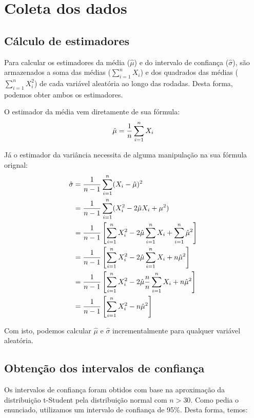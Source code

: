 \documentclass[a4paper,10pt]{article}
\begin{document}
\section{Coleta dos dados}\label{ColetaDosDados}

\subsection{Cálculo de estimadores}

Para calcular os estimadores da média ($\hat{\mu}$) e do intervalo de confiança ($\hat{\sigma}$), são armazenados a soma das médias ($\sum_{i = 1}^n X_i$) e dos quadrados das médias ($\sum_{i = 1}^n X_ i^2$) de cada variável aleatória ao longo das rodadas. Desta forma, podemos obter ambos os estimadores.

O estimador da média vem diretamente de sua fórmula:
\begin{equation}\label{estimadorMedia}
	\hat{\mu} = {{1} \over {n}} \sum_{i = 1}^n X_i
\end{equation}

Já o estimador da variância necessita de alguma manipulação na sua fórmula orignal:
\begin{align}
	\hat{\sigma} &= {{1} \over {n - 1}} \sum_{i = 1}^n (X_i - \hat{\mu})^2 \\
	&= {{1} \over {n - 1}} \sum_{i = 1}^n (X_i^2 - 2 \hat{\mu} X_i + \mu^2) \\
	&= {{1} \over {n - 1}} \left[ \sum_{i = 1}^n X_i^2 - 2 \hat{\mu} \sum_{i = 1}^n X_i + \sum_{i = 1}^n \hat{\mu}^2 \right] \\
	&= {{1} \over {n - 1}} \left[ \sum_{i = 1}^n X_i^2 - 2 \hat{\mu} \sum_{i = 1}^n X_i + n \hat{\mu}^2 \right] \\
	&= {{1} \over {n - 1}} \left[ \sum_{i = 1}^n X_i^2 - 2 \hat{\mu} {{n}\over{n}} \sum_{i = 1}^n X_i + n \hat{\mu}^2 \right] \\
	&= {{1} \over {n - 1}} \left[ \sum_{i = 1}^n X_i^2 - n \hat{\mu}^2 \right]
\end{align}

Com isto, podemos calcular $\hat{\mu}$ e $\hat{\sigma}$ incrementalmente para qualquer variável aleatória.

\subsection{Obtenção dos intervalos de confiança}

Os intervalos de confiança foram obtidos com base na aproximação da distribuição t-Student pela distribuição normal com $n > 30$. Como pedia o enunciado, utilizamos um intervalo de confiança de 95\%. Desta forma, temos:
\end{document}
